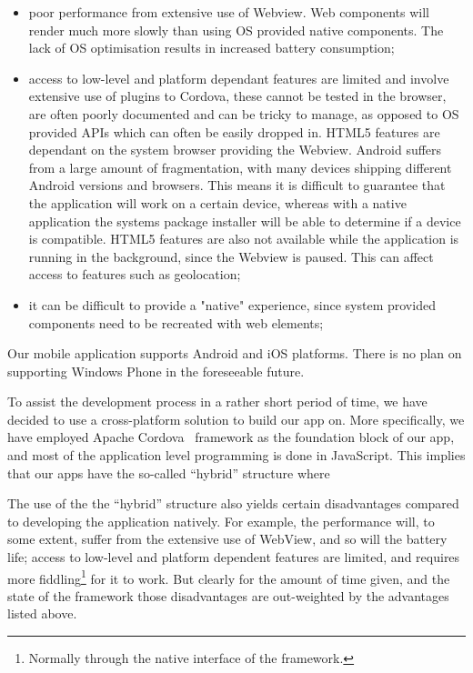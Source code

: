 \begin{itemize}
	\item poor performance from extensive use of Webview. Web components will render much more slowly than using OS provided native components. The lack of OS optimisation results in increased battery consumption;
	\item access to low-level and platform dependant features are limited and involve extensive use of plugins to Cordova, these cannot be tested in the browser, are often poorly documented and can be tricky to manage, as opposed to OS provided APIs which can often be easily dropped in. HTML5 features are dependant on the system browser providing the Webview. Android suffers from a large amount of fragmentation, with many devices shipping different Android versions and browsers. This means it is difficult to guarantee that the application will work on a certain device, whereas with a native application the systems package installer will be able to determine if a device is compatible. HTML5 features are also not available while the application is running in the background, since the Webview is paused. This can affect access to features such as geolocation;
	\item it can be difficult to provide a "native" experience, since system provided components need to be recreated with web elements;
\end{itemize}
 

Our mobile application supports Android and iOS platforms. There is no plan on supporting Windows Phone in the foreseeable future.

To assist the development process in a rather short period of time, we have decided to use a cross-platform solution to build our app on. More specifically, we have employed Apache Cordova~\cite{cordova} framework as the foundation block of our app, and most of the application level programming is done in JavaScript. This implies that our apps have the so-called ``hybrid'' structure where



The use of the the ``hybrid'' structure also yields certain disadvantages compared to developing the application natively. For example, the performance will, to some extent, suffer from the extensive use of WebView, and so will the battery life; access to low-level and platform dependent features are limited, and requires more fiddling\footnote{Normally through the native interface of the framework.} for it to work. But clearly for the amount of time given, and the state of the framework those disadvantages are out-weighted by the advantages listed above.



